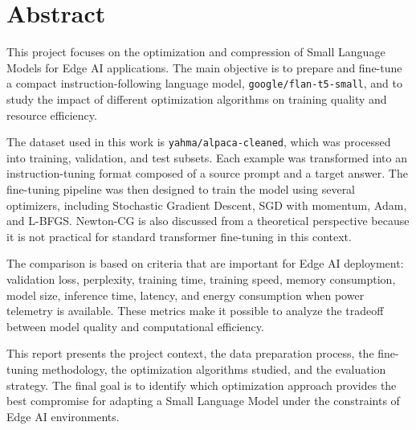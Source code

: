 \chapter*{Abstract}

\vspace*{2cm}


This project focuses on the optimization and compression of Small Language Models
for Edge AI applications. The main objective is to prepare and fine-tune a compact
instruction-following language model, \texttt{google/flan-t5-small}, and to study
the impact of different optimization algorithms on training quality and resource
efficiency.

\vspace*{0.15cm}

The dataset used in this work is \texttt{yahma/alpaca-cleaned}, which was processed
into training, validation, and test subsets. Each example was transformed into an
instruction-tuning format composed of a source prompt and a target answer. The
fine-tuning pipeline was then designed to train the model using several optimizers,
including Stochastic Gradient Descent, SGD with momentum, Adam, and L-BFGS. Newton-CG
is also discussed from a theoretical perspective because it is not practical for
standard transformer fine-tuning in this context.

\vspace*{0.15cm}

The comparison is based on criteria that are important for Edge AI deployment:
validation loss, perplexity, training time, training speed, memory consumption,
model size, inference time, latency, and energy consumption when power telemetry is
available. These metrics make it possible to analyze the tradeoff between model
quality and computational efficiency.

\vspace*{0.15cm}

This report presents the project context, the data preparation process, the
fine-tuning methodology, the optimization algorithms studied, and the evaluation
strategy. The final goal is to identify which optimization approach provides the
best compromise for adapting a Small Language Model under the constraints of Edge
AI environments.

